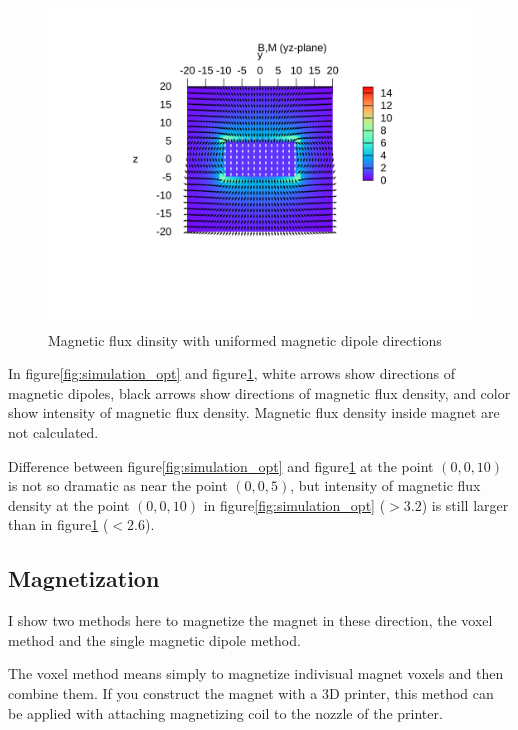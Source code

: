 \documentclass[dvipdfmx]{article}
\begin{document}
\begin{figure}[htbp]
  \begin{center}
    \includegraphics[clip, width=0.9\hsize, bb=100 200 600 600]{./resources/BM_straight.svg}
    \caption{Magnetic flux dinsity with uniformed magnetic dipole directions}
    \label{fig:simulation_straight}
  \end{center}
\end{figure}

In figure\ref{fig:simulation_opt} and figure\ref{fig:simulation_straight},
white arrows show directions of magnetic dipoles,
black arrows show directions of magnetic flux density,
and color show intensity of magnetic flux density.
Magnetic flux density inside magnet are not calculated.

Difference between figure\ref{fig:simulation_opt} and figure\ref{fig:simulation_straight} at the point $(0,0,10)$
is not so dramatic as near the point $(0,0,5)$,
but intensity of magnetic flux density at the point $(0,0,10)$ in figure\ref{fig:simulation_opt} ($>3.2$)
is still larger than in figure\ref{fig:simulation_straight} ($<2.6$).



\subsection{Magnetization}
I show two methods here to magnetize the magnet in these direction,
the voxel method and the single magnetic dipole method.

The voxel method means simply to magnetize indivisual magnet voxels and then combine them.
If you construct the magnet with a 3D printer,
this method can be applied with attaching magnetizing coil to the nozzle of the printer.
\end{document}
